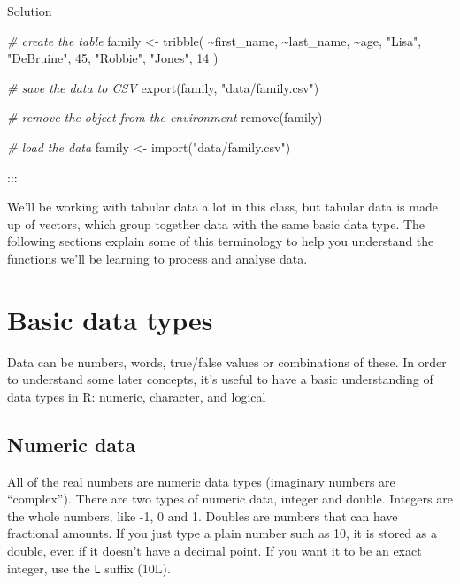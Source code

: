 \documentclass[
  oneside]{book}
\newenvironment{Shaded}{\begin{snugshade}}{\end{snugshade}}
\newcommand{\CommentTok}[1]{\textcolor[rgb]{0.56,0.35,0.01}{\textit{#1}}}
\newcommand{\DecValTok}[1]{\textcolor[rgb]{0.00,0.00,0.81}{#1}}
\newcommand{\FunctionTok}[1]{\textcolor[rgb]{0.00,0.00,0.00}{#1}}
\newcommand{\NormalTok}[1]{#1}
\newcommand{\OtherTok}[1]{\textcolor[rgb]{0.56,0.35,0.01}{#1}}
\newcommand{\SpecialCharTok}[1]{\textcolor[rgb]{0.00,0.00,0.00}{#1}}
\newcommand{\StringTok}[1]{\textcolor[rgb]{0.31,0.60,0.02}{#1}}
\begin{document}
Solution

\begin{Shaded}
\begin{Highlighting}[]
\CommentTok{\# create the table}
\NormalTok{family }\OtherTok{\textless{}{-}} \FunctionTok{tribble}\NormalTok{(}
  \SpecialCharTok{\textasciitilde{}}\NormalTok{first\_name, }\SpecialCharTok{\textasciitilde{}}\NormalTok{last\_name, }\SpecialCharTok{\textasciitilde{}}\NormalTok{age,}
  \StringTok{"Lisa"}\NormalTok{, }\StringTok{"DeBruine"}\NormalTok{, }\DecValTok{45}\NormalTok{,}
  \StringTok{"Robbie"}\NormalTok{, }\StringTok{"Jones"}\NormalTok{, }\DecValTok{14}
\NormalTok{)}

\CommentTok{\# save the data to CSV}
\FunctionTok{export}\NormalTok{(family, }\StringTok{"data/family.csv"}\NormalTok{)}

\CommentTok{\# remove the object from the environment}
\FunctionTok{remove}\NormalTok{(family)}

\CommentTok{\# load the data}
\NormalTok{family }\OtherTok{\textless{}{-}} \FunctionTok{import}\NormalTok{(}\StringTok{"data/family.csv"}\NormalTok{)}
\end{Highlighting}
\end{Shaded}

:::

We'll be working with tabular data a lot in this class, but tabular data is made up of vectors, which group together data with the same basic data type. The following sections explain some of this terminology to help you understand the functions we'll be learning to process and analyse data.

\hypertarget{data_types}{%
\section{Basic data types}\label{data_types}}

Data can be numbers, words, true/false values or combinations of these. In order to understand some later concepts, it's useful to have a basic understanding of data types in R: numeric, character, and logical

\hypertarget{numeric-data}{%
\subsection{Numeric data}\label{numeric-data}}

All of the real numbers are numeric data types (imaginary numbers are ``complex''). There are two types of numeric data, integer and double. Integers are the whole numbers, like {-}{1}, {0} and {1}. Doubles are numbers that can have fractional amounts. If you just type a plain number such as {10}, it is stored as a double, even if it doesn't have a decimal point. If you want it to be an exact integer, use the \texttt{L} suffix ({10L}).
\end{document}
